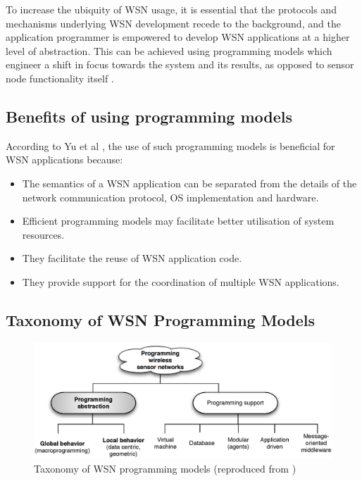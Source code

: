 To increase the ubiquity of WSN
usage, it is essential that the protocols and mechanisms underlying WSN
development recede to the background, and the application programmer is
empowered to develop WSN applications at a higher level of abstraction. This
can be achieved using programming models which engineer a shift in focus
towards the system and its results, as opposed to sensor node functionality
itself \cite{mottola_middleware:2008}. 

\subsection{Benefits of using programming models}

According to Yu et al \cite{yu_issuesMiddleware:2004}, the use of such
programming models is beneficial for WSN applications because:
\begin{itemize}
\item The semantics of a WSN application can be separated from the details of 
the network communication protocol, OS implementation and hardware.
\item Efficient programming models may facilitate better utilisation of system 
resources.
\item They facilitate the reuse of WSN application code.
\item They provide support for the coordination of multiple WSN applications.
\end{itemize}

\subsection{Taxonomy of WSN Programming Models}

\begin{figure}
\centering
\includegraphics[width=\textwidth]{img/ProgrammingAbstractions.eps} 
\caption[Taxonomy of WSN programming models]{Taxonomy of WSN programming models (reproduced from
\cite{hadim_middleware:2006})}
\label{Fig:ProgrammingModels}
\end{figure}

